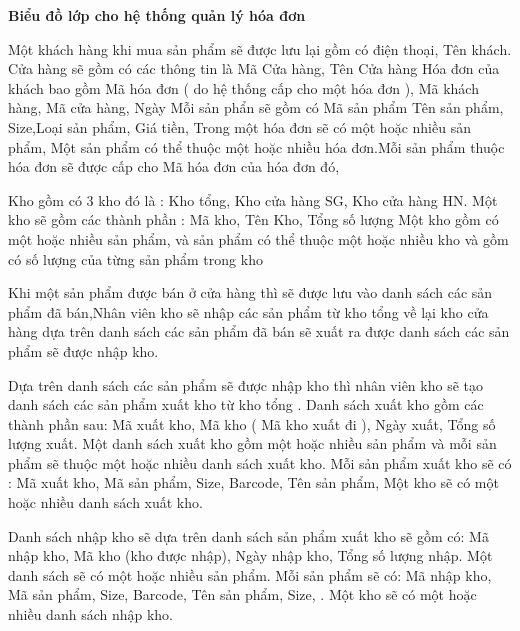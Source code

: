 \documentclass{article}
\begin{document}
\fontsize{14}{20}\selectfont\textbf{Biểu đồ lớp cho hệ thống quản lý hóa đơn\\}
\fontsize{13}{20}\selectfont

Một khách hàng khi mua sản phẩm sẽ được lưu lại gồm có điện thoại, Tên khách. 
Cửa hàng sẽ gồm có các thông tin là Mã Cửa hàng, Tên Cửa hàng 
Hóa đơn của khách bao gồm Mã hóa đơn ( do hệ thống cấp cho một hóa đơn ), Mã khách hàng, Mã cửa hàng, Ngày 
Mỗi sản phẩn sẽ gồm có  Mã sản phẩm  Tên sản phẩm, Size,Loại sản phẩm, Giá tiền, 
Trong một hóa đơn sẽ có một hoặc nhiều sản phẩm, Một sản phẩm có thể thuộc một hoặc nhiều hóa đơn.Mỗi sản phẩm thuộc hóa đơn sẽ được cấp cho Mã hóa đơn của hóa đơn đó, 

Kho gồm có 3 kho đó là : Kho tổng, Kho cửa hàng SG, Kho cửa hàng HN. 
Một kho sẽ gồm các thành phần : Mã kho, Tên Kho, Tổng số lượng 
Một kho gồm có một hoặc nhiều sản phẩm, và sản phẩm có thể thuộc một hoặc nhiều kho và gồm có số lượng của từng sản phẩm trong kho

Khi một sản phẩm được bán ở cửa hàng thì sẽ được lưu vào danh sách các sản phẩm đã bán,Nhân viên kho sẽ nhập các sản phẩm từ kho tổng về lại kho cửa hàng dựa trên danh sách các sản phẩm đã bán sẽ xuất ra được danh sách các sản phẩm sẽ được nhập kho. 

Dựa trên danh sách các sản phẩm sẽ được nhập kho thì nhân viên kho sẽ tạo danh sách các sản phẩm xuất kho từ kho tổng . Danh sách xuất kho gồm các thành phần sau: Mã xuất kho, Mã kho ( Mã kho xuất đi ), Ngày xuất, Tổng số lượng xuất. Một danh sách xuất kho gồm một hoặc nhiều sản phẩm và mỗi sản phẩm sẽ thuộc một hoặc nhiều danh sách xuất kho. Mỗi sản phẩm xuất kho sẽ có : Mã xuất kho, Mã sản phẩm, Size, Barcode, Tên sản phẩm,  Một kho sẽ có một hoặc nhiều danh sách xuất kho. 

Danh sách nhập kho sẽ dựa trên danh sách sản phẩm xuất kho sẽ gồm có: Mã nhập kho, Mã kho (kho được nhập), Ngày nhập kho, Tổng số lượng nhập. Một danh sách sẽ có một hoặc nhiều sản phẩm. Mỗi sản phẩm sẽ có: Mã nhập kho, Mã sản phẩm, Size, Barcode, Tên sản phẩm, Size, .  Một kho sẽ có một hoặc nhiều danh sách nhập kho.\\
\end{document}

